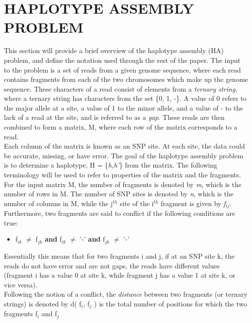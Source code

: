 \documentclass[10pt,twocolumn]{witseiepaper}
\begin{document}

\section{HAPLOTYPE ASSEMBLY PROBLEM} \label{sec:hap}

This section will provide a brief overview of the haplotype assembly (HA) problem, and define the
notation used through the rest of the paper. The input to the problem is a set of reads from a given genome
sequence, where each read contains fragments from each of the two chromosomes which make up the genome
sequence. These characters of a read consist of elements from a \textit{ternary string}, where a ternary
string has characters from the set \{0, 1, -\}. A value of 0 refers to the major allele
at a site, a value of 1 to the minor allele, and a value of - to the lack of a read at the site, and is
referred to as a \textit{gap}. These reads are then combined to form a matrix, M, where each row of the 
matrix corresponds to a read. \\
Each column of the matrix is known as an SNP site. At each site, the data could be accurate, missing, or have
error. The goal of the haplotype assembly problem is to determine a haplotype, H = \{\textit{h,h'}\}
from the matrix. The following terminology will be used to refer to properties of the matrix and the
fragments. \\
For the input matrix M, the number of fragments is denoted by \textit{m}, which is the number of rows in M.
The number of SNP sites is denoted by \textit{n}, which is the number of columns in M, while the j$^{th}$ 
site of the i$^{th}$ fragment is given by \textit{f$_{ij}$}. Furthermore, two fragments are said to 
conflict if the following conditions are true:
\begin{itemize}
    \item{f$_{ik}$ $\neq$ f$_{jk}$ \textbf{and} f$_{ik}$ $\neq$ '-' \textbf{and} f$_{jk}$ $\neq$ '-' }
\end{itemize}
Essentially this means that for two fragments i and j, if at an SNP site k, the reads do not have error and are 
not gaps, the reads have different values (fragment i has a value 0 at site k, while fragment j has a value 
1 at site k, or vice versa). \\
Following the notion of a conflict, the \textit{distance} between two fragments (or ternary strings) is
denoted by d( f$_i$, f$_j$ ) is the total number of positions for which the two fragments f$_i$ and f$_j$
\end{document}
